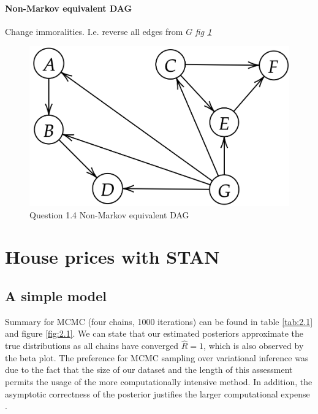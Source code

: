 \documentclass[11pt,a4paper]{article}
\begin{document}
\paragraph{Non-Markov equivalent DAG}
Change immoralities. I.e. reverse all edges from \(G\) \textit{fig \ref{fig:1.4}}
\begin{figure}[htb]
  \centering
    \includegraphics[width=\textwidth]{../q1/fig14.png}
    \caption{Question 1.4 Non-Markov equivalent DAG}
  \label{fig:1.4}
\end{figure}

\section{House prices with STAN}

  \subsection{A simple model}
  Summary for MCMC (four chains, 1000 iterations) can be found in table \ref{tab:2.1} and figure \ref{fig:2.1}.
  We can state that our estimated posteriors approximate the true distributions as all chains have converged \(\hat{R} = 1\), which is also observed by the beta plot. The preference for MCMC sampling over variational inference was due to the fact that the size of our dataset and the length of this assessment permits the usage of the more computationally intensive method. In addition, the asymptotic correctness of the posterior justifies the larger computational expense \parencite{BleiVI}.
\end{document}
